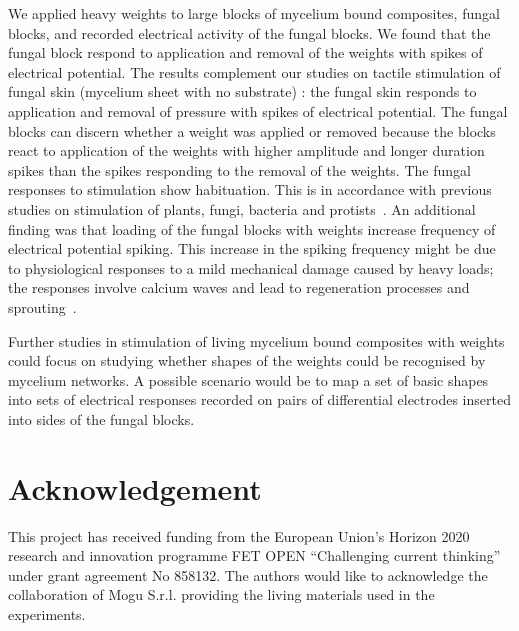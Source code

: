 \documentclass[]{elsarticle}
\begin{document}
We applied heavy weights to large blocks of mycelium bound composites, fungal blocks, and recorded electrical activity of the fungal blocks. We found that the fungal block respond to application and removal of the weights with spikes of electrical potential. The results complement our studies on tactile stimulation of fungal skin (mycelium sheet with no substrate) \cite{adamatzky2021fungal}: the fungal skin responds to application and removal of pressure with spikes of electrical potential. 
The fungal blocks can discern whether a weight was applied or removed because the blocks react to application of the weights with higher amplitude and longer duration spikes than the spikes responding to the removal of the weights. The fungal responses to stimulation show habituation. This is in accordance with previous studies on stimulation of plants, fungi, bacteria and protists~\cite{applewhite1975learning,fukasawa2020ecological,ginsburg2021evolutionary,boussard2019memory,yokochi1926investigation}. An additional finding was that loading of the fungal blocks with weights increase frequency of electrical potential spiking. This increase in the spiking frequency might be due to physiological responses to a mild mechanical damage caused by heavy loads; the responses involve calcium waves and lead to regeneration processes and sprouting~\cite{hernandez2015damage}.

Further studies in stimulation of living mycelium bound composites with weights could focus on studying whether shapes of the weights could be recognised by mycelium networks. A possible scenario would be to map a set of basic shapes into sets of electrical responses recorded on pairs of differential electrodes inserted into sides of the fungal blocks. 



\section*{Acknowledgement}

This project has received funding from the European Union's Horizon 2020 research and innovation programme FET OPEN ``Challenging current thinking'' under grant agreement No 858132. The authors would like to acknowledge the collaboration of Mogu S.r.l. providing the living materials used in the experiments.

%
\end{document}
